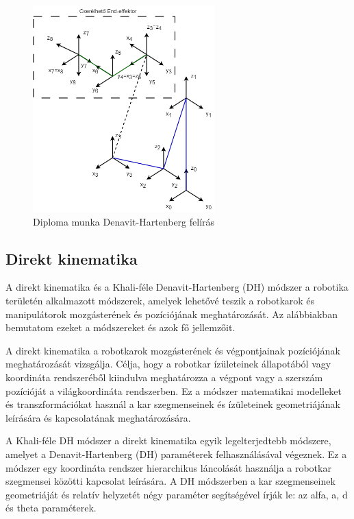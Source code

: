 \begin{figure}[!ht]
\centering
\includegraphics[width=70mm, keepaspectratio]{figures/Diagrammok/DH_feliras}
\caption{Diploma munka Denavit-Hartenberg felírás}
\label{fig:Csuklo_5}
\end{figure}



\subsection{Direkt kinematika}
A direkt kinematika és a Khali-féle Denavit-Hartenberg (DH) módszer a robotika területén alkalmazott módszerek, amelyek lehetővé teszik a robotkarok és manipulátorok mozgásterének és pozíciójának meghatározását. Az alábbiakban bemutatom ezeket a módszereket és azok fő jellemzőit.

A direkt kinematika a robotkarok mozgásterének és végpontjainak pozíciójának meghatározását vizsgálja. Célja, hogy a robotkar ízületeinek állapotából vagy koordináta rendszeréből kiindulva meghatározza a végpont vagy a szerszám pozícióját a világkoordináta rendszerben. Ez a módszer matematikai modelleket és transzformációkat használ a kar szegmenseinek és ízületeinek geometriájának leírására és kapcsolatának meghatározására.

A Khali-féle DH módszer a direkt kinematika egyik legelterjedtebb módszere, amelyet a Denavit-Hartenberg (DH) paraméterek felhasználásával végeznek. Ez a módszer egy koordináta rendszer hierarchikus láncolását használja a robotkar szegmensei közötti kapcsolat leírására. A DH módszerben a kar szegmenseinek geometriáját és relatív helyzetét négy paraméter segítségével írják le: az alfa, a, d és theta paraméterek.

